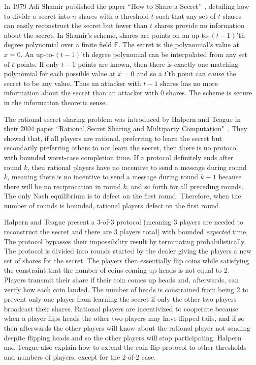 \documentclass[12pt]{dalcsthesis}
\begin{document}
In 1979 Adi Shamir published the paper ``How to Share a Secret"~\cite{shamir79}, detailing how to divide a secret into $n$ shares with a threshold $t$ such that any set of $t$ shares can easily reconstruct the secret but fewer than $t$ shares provide no information about the secret. In Shamir's scheme, shares are points on an up-to-$(t-1)$'th degree polynomial over a finite field $\mathbb{F}$. The secret is the polynomial's value at $x=0$. An up-to-$(t-1)$'th degree polynomial can be interpolated from any set of $t$ points. If only $t-1$ points are known, then there is exactly one matching polynomial for each possible value at $x=0$ and so a $t$'th point can cause the secret to be any value. Thus an attacker with $t-1$ shares has no more information about the secret than an attacker with $0$ shares. The scheme is secure in the information theoretic sense.

The rational secret sharing problem was introduced by Halpern and Teague in their 2004 paper ``Rational Secret Sharing and Multiparty Computation"~\cite{halpern04}. They showed that, if all players are rational, preferring to learn the secret but secondarily preferring others to not learn the secret, then there is no protocol with bounded worst-case completion time. If a protocol definitely ends after round $k$, then rational players have no incentive to send a message during round $k$, meaning there is no incentive to send a message during round $k-1$ because there will be no reciprocation in round $k$, and so forth for all preceding rounds. The only Nash equilibrium is to defect on the first round. Therefore, when the number of rounds is bounded, rational players defect on the first round.

Halpern and Teague present a 3-of-3 protocol (meaning 3 players are needed to reconstruct the secret and there are 3 players total) with bounded \emph{expected} time. The protocol bypasses their impossibility result by terminating probabilistically. The protocol is divided into rounds started by the dealer giving the players a new set of shares for the secret. The players then essentially flip coins while satisfying the constraint that the number of coins coming up heads is not equal to 2. Players transmit their share if their coin comes up heads and, afterwards, can verify how each coin landed. The number of heads is constrained from being 2 to prevent only one player from learning the secret if only the other two players broadcast their shares. Rational players are incentivized to cooperate because when a player flips heads the other two players may have flipped tails, and if so then afterwards the other players will know about the rational player not sending despite flipping heads and so the other players will stop participating. Halpern and Teague also explain how to extend the coin flip protocol to other thresholds and numbers of players, except for the $2$-of-$2$ case.
\end{document}
